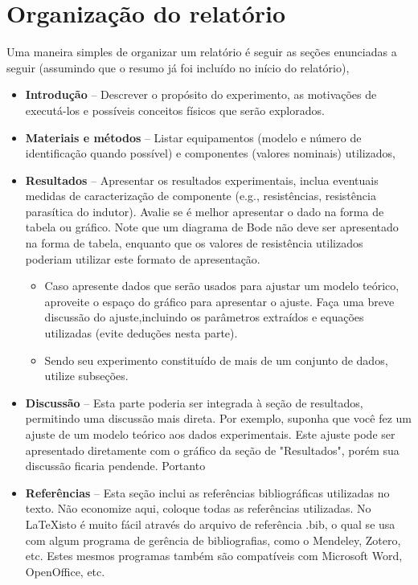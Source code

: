 \documentclass[a4paper]{article}
\begin{document}
\section{Organização do relatório}
Uma maneira simples de organizar um relatório é seguir as seções enunciadas a seguir (assumindo que o resumo já foi incluído no início do relatório),
\begin{itemize}
\item \textbf{Introdução} -- Descrever o propósito do experimento, as motivações de executá-los e possíveis conceitos físicos que serão explorados.
\item \textbf{Materiais e métodos} -- Listar equipamentos (modelo e número de identificação quando possível) e componentes (valores nominais) utilizados,
\item \textbf{Resultados} -- Apresentar os resultados experimentais, inclua eventuais medidas de caracterização de componente (e.g., resistências, resistência parasítica do indutor). Avalie se é melhor apresentar o dado na forma de tabela ou gráfico. Note que um diagrama de Bode não deve ser apresentado na forma de tabela, enquanto que os valores de resistência utilizados poderiam utilizar este formato de apresentação. 
\begin{itemize}

\item Caso apresente dados que serão usados para ajustar um modelo teórico, aproveite o espaço do gráfico para apresentar o ajuste. Faça uma breve discussão do ajuste,incluindo os parâmetros extraídos e equações utilizadas (evite deduções nesta parte). 

\item Sendo seu experimento constituído de mais de um conjunto de dados, utilize subseções.
\end{itemize}

\item \textbf{Discussão} -- Esta parte poderia ser integrada à seção de resultados, permitindo uma discussão mais direta. Por exemplo, suponha que você fez um ajuste de um modelo teórico aos dados experimentais. Este ajuste  pode ser apresentado diretamente com o gráfico da seção de "Resultados", porém sua discussão ficaria pendende. Portanto
\item \textbf{Referências} -- Esta seção inclui as referências bibliográficas utilizadas no texto. Não economize aqui, coloque todas as referências utilizadas. No \LaTeX isto é muito fácil através do arquivo de referência .bib, o qual se usa com algum programa de gerência de bibliografias, como o Mendeley, Zotero, etc. Estes mesmos programas também são compatíveis com Microsoft Word, OpenOffice, etc.
\end{itemize}
\end{document}
